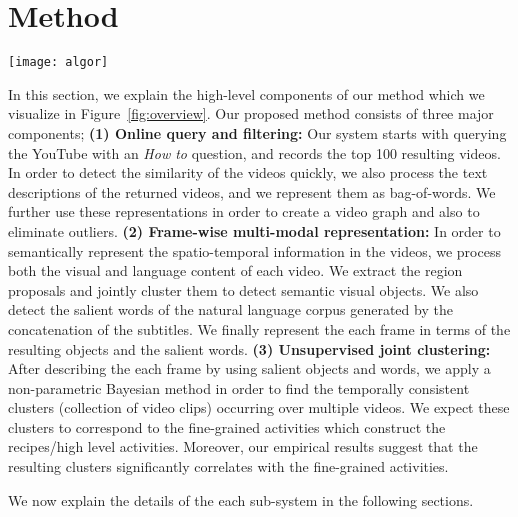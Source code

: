 \section{Method}
\label{sec:overview}
\begin{figure*}[t]
  \texttt{[image: algor]}
  \caption{Components of our recipe understanding method. \textbf{Query:} We query the YouTube for top 100 \emph{How To} videos and filter the outliers; \textbf{Framewise Representation:} We automatically extract object clusters and salient word in order to find multi-modal representation of each frame. \textbf{Unsupervised Activity Detection:} We jointly cluster videos in order to learn activities/steps related to the recipe.}
\label{fig:overview}
\end{figure*}

In this section, we explain the high-level components of our method which we visualize in Figure~\ref{fig:overview}. Our proposed method consists of three major components; \textbf{(1) Online query and filtering:} Our system starts with querying the YouTube with an \emph{How to} question, and records the top 100 resulting videos. In order to detect the similarity of the videos quickly, we also process the text descriptions of the returned videos, and we represent them as bag-of-words. We further use these representations in order to create a video graph and also to eliminate outliers. \textbf{(2) Frame-wise multi-modal representation:} In order to semantically represent the spatio-temporal information in the videos, we process both the visual and language content of each video. We extract the region proposals and jointly cluster them to detect semantic visual objects. We also detect the salient words of the natural language corpus generated by the concatenation of the subtitles. We finally represent the each frame in terms of the resulting objects and the salient words. \textbf{(3) Unsupervised joint clustering:} After describing the each frame by using salient objects and words, we apply a non-parametric Bayesian method in order to find the temporally consistent clusters (collection of video clips) occurring over multiple videos. We expect these clusters to correspond to the fine-grained activities which construct the recipes/high level activities. Moreover, our empirical results suggest that the resulting clusters significantly correlates with the fine-grained activities.

We now explain the details of the each sub-system in the following sections.

